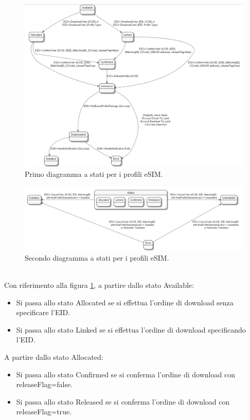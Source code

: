 \documentclass[10pt, twoside, openany]{book}
\begin{document}
\begin{figure}
\includegraphics[width=\linewidth]{profile-states1.png}
\caption{Primo diagramma a stati per i profili eSIM.}
\label{fig:profile-states1}
\end{figure}
\begin{figure}
\includegraphics[width=\linewidth]{profile-states2.png}
\caption{Secondo diagramma a stati per i profili eSIM.}
\label{fig:profile-states2}
\end{figure}
\\Con riferimento alla figura \ref{fig:profile-states1}, a partire dallo stato Available:
\begin{itemize}
\item Si passa allo stato Allocated se si effettua l'ordine di download senza specificare l'EID.
\item Si passa allo stato Linked se si effettua l'ordine di download specificando l'EID.
\end{itemize}
A partire dallo stato Allocated:
\begin{itemize}
\item Si passa allo stato Confirmed se si conferma l'ordine di download con releaseFlag=false.
\item Si passa allo stato Released se si conferma l'ordine di download con releaseFlag=true.
\end{itemize}
\end{document}
